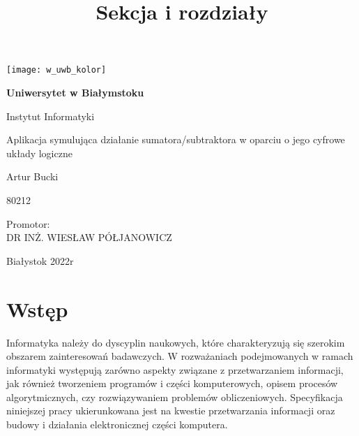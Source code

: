 \documentclass[12pt, a4paper, onside, polish]{article}				%
\title{Sekcja i rozdziały}						%
\begin{document}
\begin{titlepage}
	\begin{center}
	
		\texttt{[image: w\_uwb\_kolor]}
		
		\vspace{2cm}

	
		\Huge
        		\textbf{Uniwersytet w Białymstoku}
        		
        		\vspace{0.5cm}
        		\LARGE
        		Instytut Informatyki
        		
        		\vspace{1cm}
        		\LARGE
        		Aplikacja symulująca działanie sumatora/subtraktora w oparciu o jego cyfrowe układy logiczne 
        		
        		\vspace{1.5cm}
        		\large
        		Artur Bucki
        		
        		\large
        		80212
        		
        		\vspace{0.5cm}
        		
		\begin{flushright}
		Promotor:\\
		DR INŻ. WIESŁAW PÓŁJANOWICZ\\
		\end{flushright}


		\vspace*{\fill}
		\large
		Białystok 2022r
        		
	\end{center}
\end{titlepage}





\tableofcontents
\cleardoublepage


\section{Wstęp}
\hspace{\parindent}
Informatyka należy do dyscyplin naukowych, które charakteryzują się szerokim obszarem zainteresowań badawczych. W rozważaniach podejmowanych w ramach informatyki występują zarówno aspekty związane z przetwarzaniem informacji, jak również tworzeniem programów i części komputerowych, opisem procesów algorytmicznych, czy rozwiązywaniem problemów obliczeniowych. Specyfikacja niniejszej pracy ukierunkowana jest na kwestie przetwarzania informacji oraz budowy i działania elektronicznej części komputera.
\end{document}
